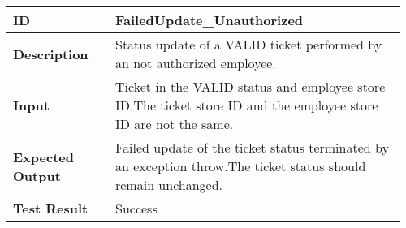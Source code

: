 \begin{table}[H]
	\centering
	\begin{tabular}{@{}p{0.25\linewidth}p{0.71\linewidth}@{}}
		\toprule
		\textbf{ID} & FailedUpdate\_Unauthorized \\
		\midrule
		\textbf{Description} & Status update of a VALID ticket performed by an not authorized employee. \\
		\midrule
		\textbf{Input} & Ticket in the VALID status and employee store ID.\newline The ticket store ID and the employee store ID are not the same.\\
		\midrule
		\textbf{Expected Output} & Failed update of the ticket status terminated by an exception throw.\newline The ticket status should remain unchanged. \\
		\midrule
		\textbf{Test Result} & Success\\
		\bottomrule
	\end{tabular}
\end{table}
